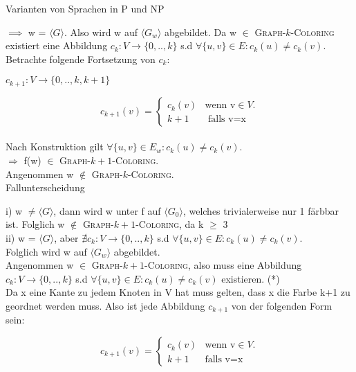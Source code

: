 \documentclass[answers]{submit}
\begin{document}
\begin{exercise}[7]{Varianten von Sprachen in P und NP}
{    $\implies$ w = $\langle G \rangle$. Also wird w auf $\langle G_w\rangle$ abgebildet. Da w $\in$ \textsc{Graph-$k$-Coloring} existiert eine Abbildung $c_k: V \rightarrow \{0,..,k\}$ s.d $\forall \{u,v\}\in E: c_k(u)\neq c_k(v)$. \\

    Betrachte folgende Fortsetzung von $c_k$:

    $c_{k+1}: V \rightarrow \{0,..,k,k+1\}$

    $$c_{k+1}(v)=\begin{cases}
        c_k(v) & \text{wenn v} \in V. \\
        k+1    & \text{ falls v=x}
      \end{cases}$$ \\

    Nach Konstruktion gilt $\forall \{u,v\}\in E_w: c_k(u)\neq c_k(v)$. \\

    $\Rightarrow$ f(w) $\in$ \textsc{Graph-$k+1$-Coloring}. \\

    Angenommen w $\notin$ \textsc{Graph-$k$-Coloring}. \\

    Fallunterscheidung

    i) w $ \neq \langle G \rangle$, dann wird w unter f auf $\langle G_0 \rangle$, welches trivialerweise nur 1 färbbar ist. Folglich w $\notin$ \textsc{Graph-$k+1$-Coloring}, da k $\geq$ 3 \\

    ii) w = $\langle G \rangle$, aber $\nexists c_k: V \rightarrow \{0,..,k\}$ s.d $\forall \{u,v\}\in E: c_k(u)\neq c_k(v)$. \\

    Folglich wird w auf $\langle G_w \rangle$ abgebildet. \\

    Angenommen w $\in$ \textsc{Graph-$k+1$-Coloring}, also muss  eine Abbildung $c_k: V \rightarrow \{0,..,k\}$ s.d $\forall \{u,v\}\in E: c_k(u)\neq c_k(v)$ existieren. (*)  \\

    Da x eine Kante zu jedem Knoten in V hat muss gelten, dass x die Farbe k+1 zu geordnet werden muss. Also ist jede Abbildung $c_{k+1}$ von der folgenden Form sein:

    $$c_{k+1}(v)=\begin{cases}
        c_k(v) & \text{wenn v} \in V. \\
        k+1    & \text{falls v=x}
      \end{cases}$$ \\

}
\end{exercise}
\end{document}

